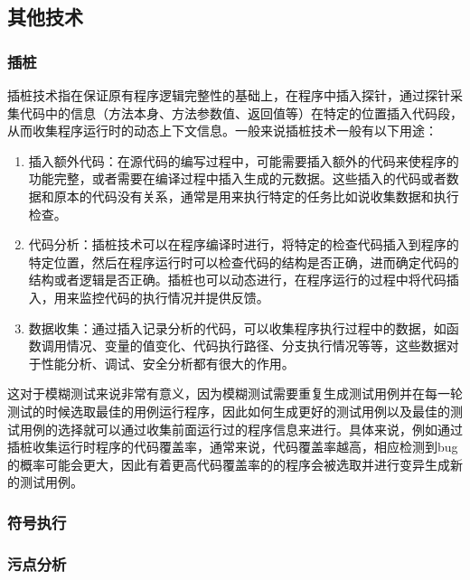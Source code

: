 \subsection{其他技术}

\subsubsection{插桩}

插桩技术指在保证原有程序逻辑完整性的基础上，在程序中插入探针，通过探针采集代码中的信息（方法本身、方法参数值、返回值等）在特定的位置插入代码段，从而收集程序运行时的动态上下文信息。一般来说插桩技术一般有以下用途：

\begin{enumerate}
\item 插入额外代码：在源代码的编写过程中，可能需要插入额外的代码来使程序的功能完整，或者需要在编译过程中插入生成的元数据。这些插入的代码或者数据和原本的代码没有关系，通常是用来执行特定的任务比如说收集数据和执行检查。
\item 代码分析：插桩技术可以在程序编译时进行，将特定的检查代码插入到程序的特定位置，然后在程序运行时可以检查代码的结构是否正确，进而确定代码的结构或者逻辑是否正确。插桩也可以动态进行，在程序运行的过程中将代码插入，用来监控代码的执行情况并提供反馈。
\item 数据收集：通过插入记录分析的代码，可以收集程序执行过程中的数据，如函数调用情况、变量的值变化、代码执行路径、分支执行情况等等，这些数据对于性能分析、调试、安全分析都有很大的作用。
\end{enumerate}

这对于模糊测试来说非常有意义，因为模糊测试需要重复生成测试用例并在每一轮测试的时候选取最佳的用例运行程序，因此如何生成更好的测试用例以及最佳的测试用例的选择就可以通过收集前面运行过的程序信息来进行。具体来说，例如通过插桩收集运行时程序的代码覆盖率，通常来说，代码覆盖率越高，相应检测到bug的概率可能会更大，因此有着更高代码覆盖率的的程序会被选取并进行变异生成新的测试用例。

\subsubsection{符号执行}

\subsubsection{污点分析}